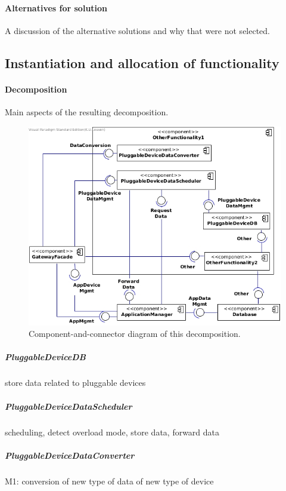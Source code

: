         \paragraph{Alternatives for solution}
            A discussion of the alternative solutions and why that were not selected.


\subsection{Instantiation and allocation of functionality}
    \paragraph{Decomposition}
        Main aspects of the resulting decomposition.

        \begin{figure}[!htp]
        	\centering
            \includegraphics[width=1.00\textwidth]{component-diagram-2}
        	\caption{Component-and-connector diagram of this decomposition.}
            \label{fig:it1-cc_main}
        \end{figure}

    \subparagraph{PluggableDeviceDB}
        store data related to pluggable devices

    \subparagraph{PluggableDeviceDataScheduler}
        scheduling, detect overload mode, store data, forward data

    \subparagraph{PluggableDeviceDataConverter}
        M1: conversion of new type of data of new type of device

